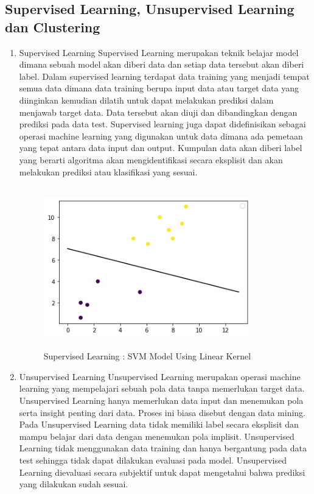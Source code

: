 	\subsection{Supervised Learning, Unsupervised Learning dan Clustering }
	\begin{enumerate}
        \item Supervised Learning
        \newline Supervised Learning merupakan teknik belajar model dimana sebuah model akan diberi data dan setiap data tersebut akan diberi label. Dalam supervised learning terdapat data training yang menjadi tempat semua data dimana data training berupa input data atau target data yang diinginkan kemudian dilatih untuk dapat melakukan prediksi  dalam menjawab target data. Data tersebut akan diuji dan dibandingkan dengan prediksi pada data test. Supervised learning juga dapat didefinisikan sebagai operasi machine learning yang digunakan untuk data dimana ada pemetaan yang tepat antara data input dan output. Kumpulan data akan diberi label yang berarti algoritma akan mengidentifikasi secara eksplisit dan akan melakukan prediksi atau klasifikasi yang sesuai. 

		\begin{figure}[!htbp]
			\centering
			\includegraphics[width=9cm,height=7cm]{figures/SVM_LinearKernel.png}
			\caption{Supervised Learning : SVM Model Using Linear Kernel}
			\label{penanda}
		\end{figure}

        \item Unsupervised Learning
        \newline Unsupervised Learning merupakan operasi machine learning yang mempelajari sebuah pola data tanpa memerlukan target data. Unsupervised Learning hanya memerlukan data input dan menemukan pola serta insight penting dari data. Proses ini biasa disebut dengan data mining. Pada Unsupervised Learning data tidak memiliki label secara eksplisit dan mampu belajar dari data dengan menemukan pola implisit. Unsupervised Learning tidak menggunakan data training dan hanya bergantung pada data test sehingga tidak dapat dilakukan evaluasi pada model. Unsupervised Learning dievaluasi secara subjektif untuk dapat mengetahui bahwa prediksi yang dilakukan sudah sesuai. 


\end{enumerate}
